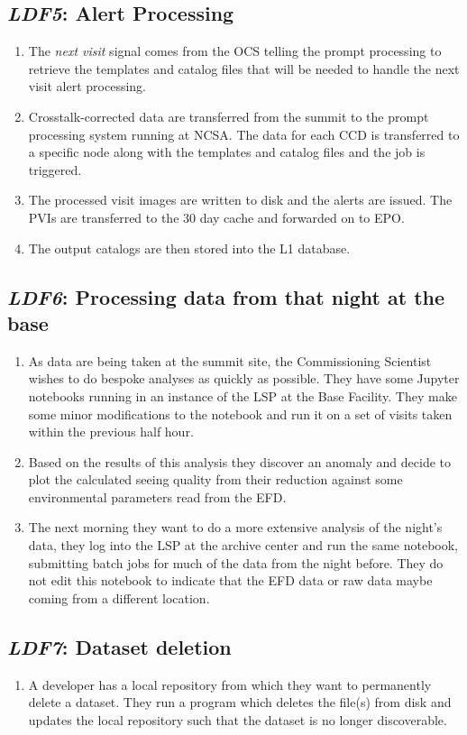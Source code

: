 \documentclass[DM,toc,lsstdraft]{lsstdoc}
\newcommand{\usecase}[3]{%
\subsection{\emph{#1}: #2}
\label{use:#1}
\begin{enumerate}[label=\alph*.]
#3
\end{enumerate}
}
\begin{document}
\usecase{LDF5}{Alert Processing}{%

\item
The \emph{next visit} signal comes from the OCS telling the prompt processing to retrieve the templates and catalog files that will be needed to handle the next visit alert processing.

\item
Crosstalk-corrected data are transferred from the summit to the prompt processing system running at NCSA.
The data for each CCD is transferred to a specific node along with the templates and catalog files and the job is triggered.

\item
The processed visit images are written to disk and the alerts are issued.
The PVIs are transferred to the 30 day cache and forwarded on to EPO.

\item
The output catalogs are then stored into the L1 database.

}

\usecase{LDF6}{Processing data from that night at the base}{%

\item
As data are being taken at the summit site, the Commissioning Scientist wishes to do bespoke analyses as quickly as possible.
They have some Jupyter notebooks running in an instance of the LSP at the Base Facility.
They make some minor modifications to the notebook and run it on a set of visits taken within the previous half hour.

\item
Based on the results of this analysis they discover an anomaly and decide to plot the calculated seeing quality from their reduction against some environmental parameters read from the EFD.

\item
The next morning they want to do a more extensive analysis of the night's data, they log into the LSP at the archive center and run the same notebook, submitting batch jobs for much of the data from the night before.
They do not edit this notebook to indicate that the EFD data or raw data maybe coming from a different location.

}

\usecase{LDF7}{Dataset deletion}{%

\item
A developer has a local repository from which they want to permanently delete a dataset.
They run a program which deletes the file(s) from disk and updates the local repository such that the dataset is no longer discoverable.

}
\end{document}
